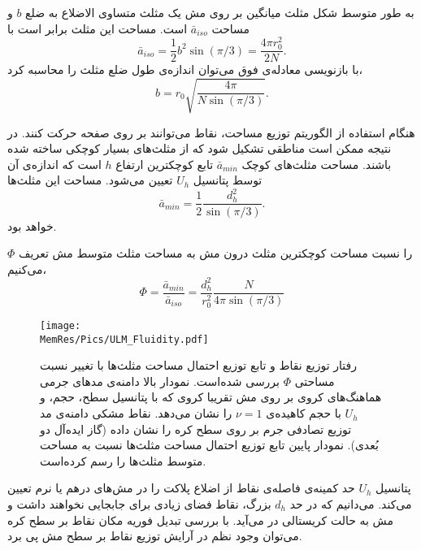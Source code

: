 به طور متوسط شکل مثلث میانگین بر روی مش یک مثلث متساوی الاضلاع به ضلع
$b$
و مساحت 
 $\bar a_{iso}$
 است. مساحت این مثلث برابر است با
 \begin{equation}
\bar a_{iso}=\frac{1}{2}b^2\sin(\pi/3)=\frac{4\pi r_0^2}{2N}.
\label{eq:averageTriArea}
\end{equation}
 با بازنویسی معادله‌ی فوق می‌توان اندازه‌ی طول ضلع مثلث را محاسبه کرد،
 \begin{equation}
b=r_0\sqrt{\frac{4\pi}{N\sin(\pi/3)}}.
\label{eq:averageTriArea}
\end{equation}
 
هنگام استفاده از الگوریتم توزیع مساحت، نقاط می‌توانند بر روی صفحه حرکت کنند. در نتیجه ممکن است مناطقی تشکیل شود که از مثلث‌های بسیار کوچکی ساخته شده باشند. مساحت مثلث‌های کوچک
$\bar a_{min}$
تابع کوچکترین ارتفاع 
$h$
است که اندازه‌ی آن توسط پتانسیل
$U_h$
تعیین می‌شود. مساحت این مثلث‌ها 
\begin{equation}
\bar a_{min}=\frac{1}{2}\frac{d_h^2}{\sin(\pi/3)}.
\label{eq:aMin}
\end{equation}
خواهد بود.


$\Phi$
را نسبت مساحت کوچکترین مثلث درون مش به مساحت مثلث متوسط مش تعریف می‌کنیم،
\begin{equation}
\Phi=\frac{\bar a_{min}}{\bar a_{iso}}=\frac{d_h^2}{r_0^2}\frac{N}{4\pi\sin(\pi/3)}
\label{eq:phiDef}
\end{equation}



\begin{figure}[htbp]
\begin{center}
\texttt{[image: \\MemRes/Pics/ULM\_Fluidity.pdf]}
\caption{
رفتار توزیع نقاط و تابع توزیع احتمال مساحت مثلث‌ها با تغییر نسبت مساحتی 
$\Phi$
بررسی شده‌است. نمودار بالا دامنه‌ی مد‌های جرمی هماهنگ‌های کروی بر روی مش تقریبا کروی که با پتانسیل سطح، حجم، و 
$U_h$
با حجم کاهیده‌ی 
$\nu=1$
را نشان می‌دهد. نقاط مشکی دامنه‌ی مد توزیع تصادفی جرم بر روی سطح کره را نشان داده (گاز ایده‌آل دو بُعدی). نمودار پایین تابع توزیع احتمال مساحت مثلث‌ها نسبت به مساحت متوسط مثلث‌ها را رسم کرده‌است.
}
\label{fig:vertexULM}
\end{center}
\end{figure}

پتانسیل
$U_h$
حد کمینه‌ی  فاصله‌ی نقاط از اضلاع پلاکت را در مش‌های درهم یا نرم تعیین می‌کند. می‌دانیم که در حد 
$d_h$
بزرگ، نقاط فضای زیادی برای جابجایی نخواهند داشت و مش به حالت کریستالی در می‌آید. با بررسی تبدیل فوریه مکان نقاط بر سطح کره می‌توان وجود نظم در آرایش توزیع نقاط بر سطح مش پی برد. 

